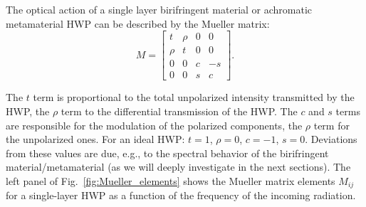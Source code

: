The optical action of a single layer birifringent material or achromatic metamaterial HWP can be described by the Mueller matrix:
\begin{equation}
M=\begin{bmatrix}
   t  &\rho  &0  &0\\
   \rho  &t  &0  &0\\
   0  &0  &c  &-s\\
   0  &0  &s  &c
\end{bmatrix}.
\label{eq:Mueller_Matrix}
\end{equation}

The $t$ term is proportional to the total unpolarized intensity transmitted by the HWP, the $\rho$ term to the differential transmission of the HWP. The $c$ and $s$ terms are responsible for the modulation of the polarized components, the $\rho$ term for the unpolarized ones. For an ideal HWP: $t=1$, $\rho=0$, $c=-1$, $s=0$. Deviations from these values are due, e.g., to the spectral behavior of the birifringent material/metamaterial (as we will deeply investigate in the next sections). The left panel of Fig.~\ref{fig:Mueller_elements} shows the Mueller matrix elements $M_{ij}$ for a single-layer HWP as a function of the frequency of the incoming radiation. 

